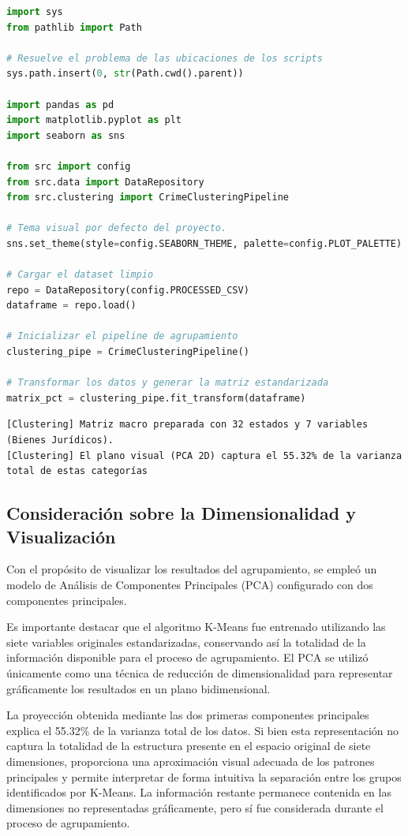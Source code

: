 \begin{lstlisting}[language=Python,caption={Construcción de la matriz de proporciones y estandarización.},label={lst:clustering-pipe-matrix}]
import sys
from pathlib import Path

# Resuelve el problema de las ubicaciones de los scripts
sys.path.insert(0, str(Path.cwd().parent))

import pandas as pd
import matplotlib.pyplot as plt
import seaborn as sns

from src import config
from src.data import DataRepository
from src.clustering import CrimeClusteringPipeline

# Tema visual por defecto del proyecto.
sns.set_theme(style=config.SEABORN_THEME, palette=config.PLOT_PALETTE)

# Cargar el dataset limpio
repo = DataRepository(config.PROCESSED_CSV)
dataframe = repo.load()

# Inicializar el pipeline de agrupamiento
clustering_pipe = CrimeClusteringPipeline()

# Transformar los datos y generar la matriz estandarizada
matrix_pct = clustering_pipe.fit_transform(dataframe)
\end{lstlisting}

\begin{lstlisting}
[Clustering] Matriz macro preparada con 32 estados y 7 variables (Bienes Jurídicos).
[Clustering] El plano visual (PCA 2D) captura el 55.32% de la varianza total de estas categorías
\end{lstlisting}

\subsection{Consideración sobre la Dimensionalidad y Visualización}

Con el propósito de visualizar los resultados del agrupamiento, se empleó un modelo de Análisis de Componentes
Principales (PCA) configurado con dos componentes principales.

Es importante destacar que el algoritmo K-Means fue entrenado utilizando las siete variables originales estandarizadas,
conservando así la totalidad de la información disponible para el proceso de agrupamiento. El PCA se utilizó únicamente
como una técnica de reducción de dimensionalidad para representar gráficamente los resultados en un plano bidimensional.

La proyección obtenida mediante las dos primeras componentes principales explica el 55.32\% de la varianza total
de los datos. Si bien esta representación no captura la totalidad de la estructura presente en el espacio original
de siete dimensiones, proporciona una aproximación visual adecuada de los patrones principales y permite interpretar
de forma intuitiva la separación entre los grupos identificados por K-Means. La información restante permanece contenida
en las dimensiones no representadas gráficamente, pero sí fue considerada durante el proceso de agrupamiento.

